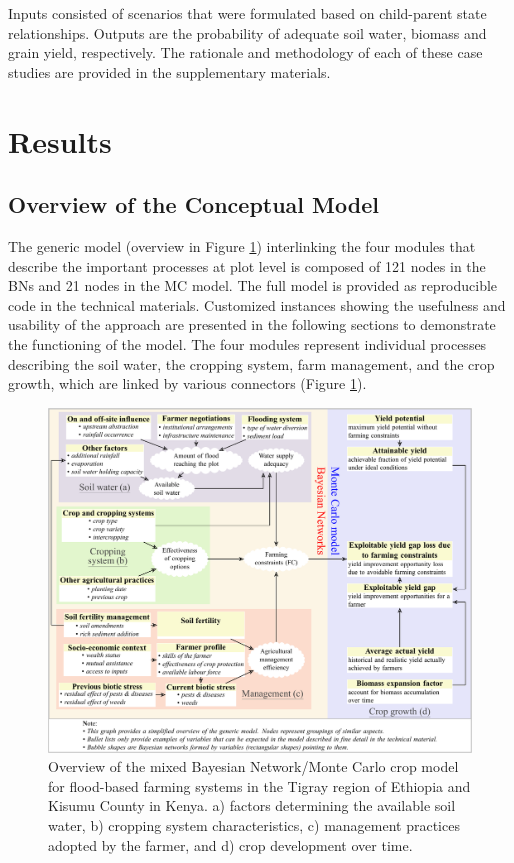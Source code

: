 \documentclass[]{elsarticle} %
\begin{document}
Inputs consisted of scenarios that were formulated based on child-parent state relationships. Outputs are the probability of adequate soil water, biomass and grain yield, respectively. The rationale and methodology of each of these case studies are provided in the supplementary materials.

\hypertarget{ref4}{%
\section{Results}\label{ref4}}

\hypertarget{ref41}{%
\subsection{Overview of the Conceptual Model}\label{ref41}}

The generic model (overview in Figure \ref{fig:fig4}) interlinking the four modules that describe the important processes at plot level is composed of 121 nodes in the BNs and 21 nodes in the MC model. The full model is provided as reproducible code in the technical materials. Customized instances showing the usefulness and usability of the approach are presented in the following sections to demonstrate the functioning of the model. The four modules represent individual processes describing the soil water, the cropping system, farm management, and the crop growth, which are linked by various connectors (Figure \ref{fig:fig4}).

\begin{figure}[!h]

{\centering \includegraphics[width=1\linewidth,]{Modelling_FBFS_files/figure-latex/fig4-plot-1} 

}

\caption{Overview of the mixed Bayesian Network/Monte Carlo crop model for flood-based farming systems in the Tigray region of Ethiopia and Kisumu County in Kenya. a) factors determining the available soil water, b) cropping system characteristics, c) management practices adopted by the farmer, and d) crop development over time.}\label{fig:fig4}
\end{figure}
\end{document}
